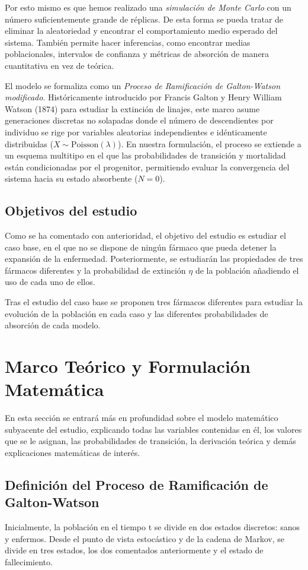 \documentclass[graybox]{SNmult}
\begin{document}
	Por esto mismo es que hemos realizado una \textit{simulación de Monte Carlo} con un número suficientemente grande de réplicas. De esta forma se pueda tratar de eliminar la aleatoriedad y encontrar el comportamiento medio esperado del sistema. También permite hacer inferencias, como encontrar medias poblacionales, intervalos de confianza y métricas de absorción de manera cuantitativa en vez de teórica. 
	
	El modelo se formaliza como un \textit{Proceso de Ramificación de Galton-Watson modificado}. Históricamente introducido por Francis Galton y Henry William Watson (1874) para estudiar la extinción de linajes, este marco asume generaciones discretas no solapadas donde el número de descendientes por individuo se rige por variables aleatorias independientes e idénticamente distribuidas ($X \sim \text{Poisson}(\lambda)$). En nuestra formulación, el proceso se extiende a un esquema multitipo en el que las probabilidades de transición y mortalidad están condicionadas por el progenitor, permitiendo evaluar la convergencia del sistema hacia su estado absorbente ($N=0$).
	
	\subsection{Objetivos del estudio}
	Como se ha comentado con anterioridad, el objetivo del estudio es estudiar el caso base, en el que no se dispone de ningún fármaco que pueda detener la expansión de la enfermedad. Posteriormente, se estudiarán las propiedades de tres fármacos diferentes y la probabilidad de extinción $\eta$ de la población añadiendo el uso de cada uno de ellos. 
	
	Tras el estudio del caso base se proponen tres fármacos diferentes para estudiar la evolución de la población en cada caso y las diferentes probabilidades de absorción de cada modelo. 
	
	\section{Marco Teórico y Formulación Matemática}
	\label{sec:marco_teorico}
	En esta sección se entrará más en profundidad sobre el modelo matemático subyacente del estudio, explicando todas las variables contenidas en él, los valores que se le asignan, las probabilidades de transición, la derivación teórica y demás explicaciones matemáticas de interés. 
	
	\subsection{Definición del Proceso de Ramificación de Galton-Watson}
	Inicialmente, la población en el tiempo t se divide en dos estados discretos: sanos y enfermos. Desde el punto de vista estocástico y de la cadena de Markov, se divide en tres estados, los dos comentados anteriormente y el estado de fallecimiento.
	
\end{document}
